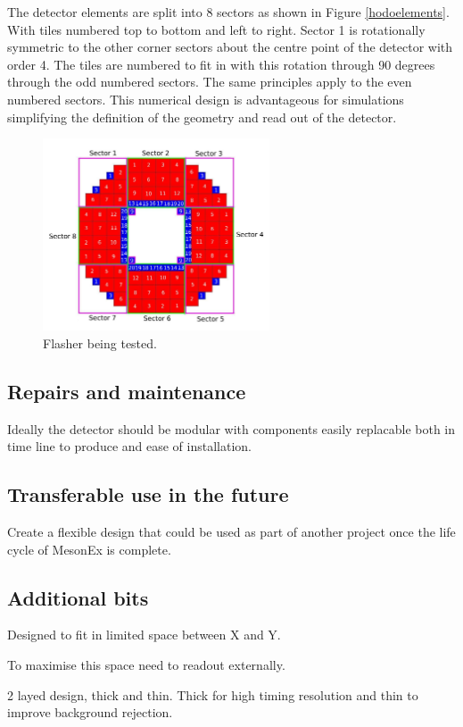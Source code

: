 The detector elements are split into 8 sectors as shown in Figure \ref{hodoelements}.  With tiles numbered top to bottom and left to right. Sector 1 is rotationally symmetric to the other corner sectors about the centre point of the detector with order 4. The tiles are numbered to fit in with this rotation through 90 degrees through the odd numbered sectors. The same principles apply to the even numbered sectors. This numerical design is advantageous for simulations simplifying the definition of the geometry and read out of the detector.

\begin{figure}
	\centering
	\includegraphics[width=0.6\textwidth]{ImgChap1/hodoelements}
	\caption{Flasher being tested.}
	\label{hodoelements2}
\end{figure}

\subsection{Repairs and maintenance}
Ideally the detector should be modular with components easily replacable both in time line to produce and ease of installation.
\subsection{Transferable use in the future}
Create a flexible design that could be used as part of another project once the life cycle of MesonEx is complete.

\subsection{Additional bits}
Designed to fit in limited space between X and Y.

To maximise this space need to readout externally.

2 layed design, thick and thin. Thick for high timing resolution and thin to improve background rejection.

